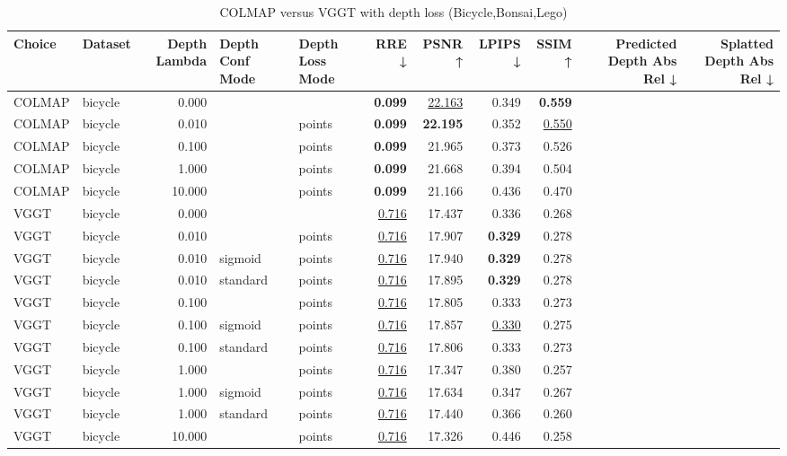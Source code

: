 \begin{table}[H]
\caption{COLMAP versus VGGT with depth loss (Bicycle,Bonsai,Lego)}
\label{tab:05_depth_lambda_bicycle,bonsai,lego}
\small
\begin{tabular}{llrllrrrrrr}
\toprule
Choice & Dataset & Depth Lambda & Depth Conf Mode & Depth Loss Mode & RRE ↓ & PSNR ↑ & LPIPS ↓ & SSIM ↑ & Predicted Depth Abs Rel ↓ & Splatted Depth Abs Rel ↓ \\
\midrule
COLMAP & bicycle & 0.000 &  &  & \textbf{0.099} & \underline{22.163} & 0.349 & \textbf{0.559} &  &  \\
COLMAP & bicycle & 0.010 &  & points & \textbf{0.099} & \textbf{22.195} & 0.352 & \underline{0.550} &  &  \\
COLMAP & bicycle & 0.100 &  & points & \textbf{0.099} & 21.965 & 0.373 & 0.526 &  &  \\
COLMAP & bicycle & 1.000 &  & points & \textbf{0.099} & 21.668 & 0.394 & 0.504 &  &  \\
COLMAP & bicycle & 10.000 &  & points & \textbf{0.099} & 21.166 & 0.436 & 0.470 &  &  \\
VGGT & bicycle & 0.000 &  &  & \underline{0.716} & 17.437 & 0.336 & 0.268 &  &  \\
VGGT & bicycle & 0.010 &  & points & \underline{0.716} & 17.907 & \textbf{0.329} & 0.278 &  &  \\
VGGT & bicycle & 0.010 & sigmoid & points & \underline{0.716} & 17.940 & \textbf{0.329} & 0.278 &  &  \\
VGGT & bicycle & 0.010 & standard & points & \underline{0.716} & 17.895 & \textbf{0.329} & 0.278 &  &  \\
VGGT & bicycle & 0.100 &  & points & \underline{0.716} & 17.805 & 0.333 & 0.273 &  &  \\
VGGT & bicycle & 0.100 & sigmoid & points & \underline{0.716} & 17.857 & \underline{0.330} & 0.275 &  &  \\
VGGT & bicycle & 0.100 & standard & points & \underline{0.716} & 17.806 & 0.333 & 0.273 &  &  \\
VGGT & bicycle & 1.000 &  & points & \underline{0.716} & 17.347 & 0.380 & 0.257 &  &  \\
VGGT & bicycle & 1.000 & sigmoid & points & \underline{0.716} & 17.634 & 0.347 & 0.267 &  &  \\
VGGT & bicycle & 1.000 & standard & points & \underline{0.716} & 17.440 & 0.366 & 0.260 &  &  \\
VGGT & bicycle & 10.000 &  & points & \underline{0.716} & 17.326 & 0.446 & 0.258 &  &  \\

\end{tabular}
\end{table}
